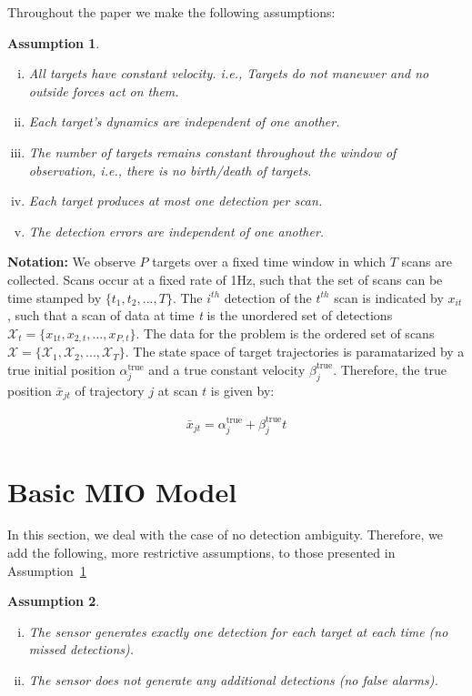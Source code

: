 \documentclass[journal]{IEEEtran}
\newtheorem{assumption}{Assumption}
\begin{document}
Throughout the paper we make the following assumptions:
\begin{assumption}\label{ass:general_assumption}
\begin{enumerate}[(i)]
\item{}All targets have constant velocity. \textit{i.e.}, Targets do not maneuver and no outside forces act on them.
\item Each target's dynamics are independent of one another.
\item The number of targets remains constant throughout the window of observation, \textit{i.e.}, there is no birth/death of targets.
\item Each target produces at most one detection per scan.
\item The detection errors are independent of one another.
\end{enumerate}
\end{assumption}

{\bf Notation:}
We observe $P$ targets over a fixed time window in which $T$ scans are collected. Scans occur at a fixed rate of 1Hz, such that the set of scans can be time stamped by $\{t_{1}, t_{2},...,T\}. $ The $i^{th}$ detection of the $t^{th}$ scan is indicated by $x_{it}$, such that a scan of data at time \textit{t} is the unordered set of detections $\mathcal{X}_{t} = \{x_{1t}, x_{2,t},...,x_{P,t}\}$. The data for the problem is the ordered set of scans $\boldsymbol{\mathcal{X}}=\{\mathcal{X}_{1},\mathcal{X}_{2},...,\mathcal{X}_{T}\}$. The state space of target trajectories is paramatarized by a true initial position $\alpha^{\text{true}}_{j}$ and a true constant velocity $\beta^{\text{true}}_{j}$. Therefore, the true position $\bar{x}_{jt}$ of trajectory $j$ at scan $t$ is given by: 

\begin{align}
	\bar{x}_{jt} = \alpha^{\text{true}}_{j} + \beta^{\text{true}}_{j}t
\end{align}

\section{Basic MIO Model}\label{sec:Basic MIO Model}
In this section, we deal with the case of no detection ambiguity. Therefore, we add the following, more restrictive assumptions, to those presented in Assumption~\ref{ass:general_assumption}
\begin{assumption}\label{ass:basic_assumptions}
\begin{enumerate}[(i)]
\item The sensor generates exactly one detection for each target at each time (no missed detections).
\item The sensor does not generate any additional detections (no false alarms).
\end{enumerate}
\end{assumption}
\end{document}
